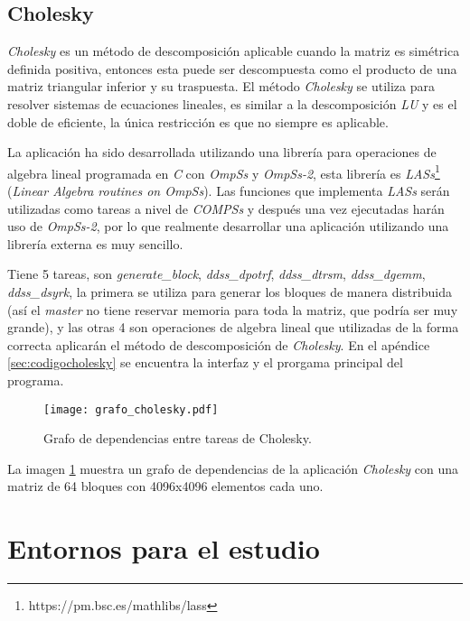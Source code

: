 \subsection{Cholesky}

\textit{Cholesky} es un método de descomposición aplicable cuando la matriz es simétrica definida positiva, entonces esta puede ser descompuesta como el producto de una matriz triangular inferior y su traspuesta. El método \textit{Cholesky} se utiliza para resolver sistemas de ecuaciones lineales, es similar a la descomposición \textit{LU} y es el doble de eficiente, la única restricción es que no siempre es aplicable.
\par\bigskip
La aplicación ha sido desarrollada utilizando una librería para operaciones de algebra lineal programada en \textit{C} con \textit{OmpSs} y \textit{OmpSs-2}, esta librería es \textit{LASs}\footnote{https://pm.bsc.es/mathlibs/lass} (\textit{Linear Algebra routines on OmpSs}). Las funciones que implementa \textit{LASs} serán utilizadas como tareas a nivel de \textit{COMPSs} y después una vez ejecutadas harán uso de \textit{OmpSs-2}, por lo que realmente desarrollar una aplicación utilizando una librería externa es muy sencillo.
\par\bigskip
Tiene 5 tareas, son \textit{generate\_block}, \textit{ddss\_dpotrf}, \textit{ddss\_dtrsm}, \textit{ddss\_dgemm}, \textit{ddss\_dsyrk}, la primera se utiliza para generar los bloques de manera distribuida (así el \textit{master} no tiene reservar memoria para toda la matriz, que podría ser muy grande), y las otras 4 son operaciones de algebra lineal que utilizadas de la forma correcta aplicarán el método de descomposición de \textit{Cholesky}.
En el apéndice \ref{sec:codigocholesky} se encuentra la interfaz y el prorgama principal del programa. 

\begin{figure}[h]
	\centering 
	\caption{Grafo de dependencias entre tareas de Cholesky.}
	\texttt{[image: grafo\_cholesky.pdf]}
	\label{fig:grafocholesky}
\end{figure}

La imagen \ref{fig:grafocholesky} muestra un grafo de dependencias de la aplicación \textit{Cholesky} con una matriz de 64 bloques con 4096x4096 elementos cada uno. 

\section{Entornos para el estudio}

